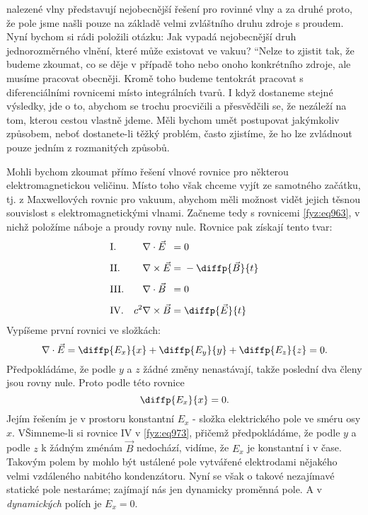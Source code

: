     nalezené vlny představují nejobecnější řešení pro rovinné vlny a za druhé proto, že pole jsme
    našli pouze na základě velmi zvláštního druhu zdroje s proudem. Nyní bychom si rádi položili
    otázku: Jak vypadá nejobecnější druh jednorozměrného vlnění, které může existovat ve vakuu?
    “Nelze to zjistit tak, že budeme zkoumat, co se děje v případě toho nebo onoho konkrétního
    zdroje, ale musíme pracovat obecněji. Kromě toho budeme tentokrát pracovat s diferenciálními
    rovnicemi místo integrálních tvarů. I když dostaneme stejné výsledky, jde o to, abychom se
    trochu procvičili a přesvědčili se, že nezáleží na tom, kterou cestou vlastně jdeme. Měli bychom
    umět postupovat jakýmkoliv způsobem, neboť dostanete-li těžký problém, často zjistíme, že ho
    lze zvládnout pouze jedním z rozmanitých způsobů.
    
    Mohli bychom zkoumat přímo řešení vlnové rovnice pro některou elektromagnetickou veličinu. Místo
    toho však chceme vyjít ze samotného začátku, tj. z Maxwellových rovnic pro vakuum, abychom měli
    možnost vidět jejich těsnou souvislost s elektromagnetickými vlnami. Začneme tedy s rovnicemi
    \eqref{fyz:eq963}, v nichž položíme náboje a proudy rovny nule. Rovnice pak získají tento tvar:
    \begin{equation}\label{fyz:eq973}
      \begin{alignedat}{3}
        &\text{I.}  &&\nabla\cdot \vec{E}          &\;=&\;0\\[1ex]
        &\text{II.} &&\nabla\times\vec{E}          &\;=&\;-\diffp{\vec{B}}{t}\\[1ex]
        &\text{III.}&&\nabla\cdot \vec{B}          &\;=&\;0\\[1ex]
        &\text{IV.}  &\quad c^2&\nabla\times\vec{B}&\;=&\;\diffp{\vec{E}}{t}
      \end{alignedat}
    \end{equation}
    Vypíšeme první rovnici ve složkách:
    \begin{equation}\label{fyz:eq974}
      \nabla\cdot\vec{E}=\diffp{E_x}{x}+\diffp{E_y}{y}+\diffp{E_z}{z}=0.
    \end{equation}
    Předpokládáme, že podle \(y\) a \(z\) žádné změny nenastávají, takže poslední dva členy jsou
    rovny nule. Proto podle této rovnice
    \begin{equation}\label{fyz:eq975}
      \diffp{E_x}{x}=0.
    \end{equation}
    Jejím řešením je v prostoru konstantní \(E_x\) - složka elektrického pole ve sméru osy \(x\).
    VŠimneme-li si rovnice IV v \eqref{fyz:eq973}, přičemž předpokládáme, že podle \(y\) a podle
    \(z\) k žádným zménám \(\vec{B}\) nedochází, vidíme, že \(E_x\) je konstantní i v čase. Takovým
    polem by mohlo být ustálené pole vytvářené elektrodami nějakého velmi vzdáleného nabitého
    kondenzátoru. Nyní se však o takové nezajímavé statické pole nestaráme; zajímají nás jen
    dynamicky proměnná pole. A v \emph{dynamických} polích je \(E_x=0\).
    
